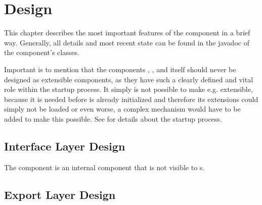 
\section{\COMPextensionManagement{} Design}
\label{sec:COMPextensionManagementDesign}

This chapter describes the most important features of the \COMPextensionManagement{} component in a brief way. Generally, all details and most recent state can be found in the javadoc of the component's classes.

Important is to mention that the \LibName{} components \COMPlogging{}, \COMPconfiguration{},  \COMPcontext{} and \COMPextensionManagement{} itself should never be designed as extensible components, as they have such a clearly defined and vital role within the \LibName{} startup process. It simply is not possible to make e.g. \COMPlogging{} extensible, because it is needed before \COMPextensionManagement{} is already initialized and therefore its extensions could simply not be loaded or even worse, a complex mechanism would have to be added to make this possible. See  for details about the \LibName{} startup process.


\subsection{Interface Layer Design}
\label{sec:InterfaceDesignCOMPextensionManagement}

The \COMPextensionManagement{} component is an internal component that is not visible to \LibName{} \ACTORuser{}s.


\subsection{Export Layer Design}
\label{sec:ExportDesignCOMPextensionManagement}

